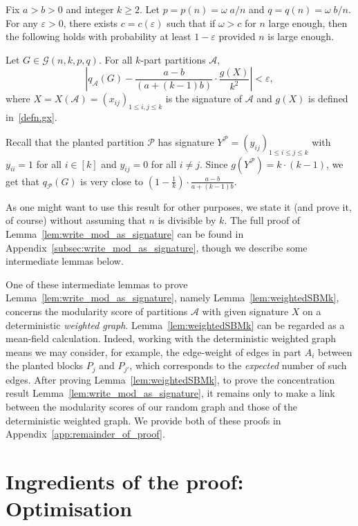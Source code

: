 \documentclass[a4paper,UKenglish,cleveref, autoref, thm-restate,numberwithinsect]{lipics-v2021}
\newcommand{\cA}{\mathcal{A}}
\newcommand{\cP}{\mathcal{P}}
\newcommand{\eps}{\varepsilon}
\begin{document}
\begin{lemma}
\label{lem:write_mod_as_signature}
Fix $a>b>0$ and integer $k\geq 2$. Let $p=p(n)=\omega\; a / n$ and $q=q(n)=\omega \; b/n$. For any $\eps>0$, there exists $c=c(\eps)$ such that if $\omega>c$ for $n$ large enough, then the following holds with probability at least $1-\eps$ provided $n$ is large enough.


Let $G \in \mathcal{G}(n,k,p,q)$. For all $k$-part partitions $\cA$, 
\[ 
\left| q_\cA(G) - \frac{a-b}{(a+(k-1)b)} \cdot \frac {g(X)}{k^2} \right| < \eps, 
\]
where $X = X(\cA) =(x_{ij})_{1\leq i,j \leq k}$ is the signature of $\cA$ and $g(X)$ is defined  in~\eqref{defn.gx}.
\end{lemma}

Recall that the planted partition $\cP$ has signature $Y^{\cP}=(y_{ij})_{1\leq i \leq j \leq k}$ with $y_{ii}=1$ for all $i \in [k]$ and $y_{ij}=0$ for all $i\neq j$. Since $g(Y^{\cP}) = k \cdot (k-1)$, we get that $q_\cP (G)$ is very close to $\left(1-\frac {1}{k}\right) \cdot \frac{a-b}{a+(k-1)b}$. 


As one might want to use this result for other purposes, we state it (and prove it, of course) without assuming that $n$ is divisible by $k$. The full proof of Lemma~\ref{lem:write_mod_as_signature} can be found in {Appendix~\ref{subsec:write_mod_as_signature},} though we describe some intermediate lemmas below.

One of these intermediate lemmas to prove Lemma~\ref{lem:write_mod_as_signature}, namely Lemma~\ref{lem:weightedSBMk},  concerns the modularity score of partitions $\cA$ with given signature $X$ on a deterministic \emph{weighted graph}. Lemma~\ref{lem:weightedSBMk} can be regarded as a mean-field calculation. Indeed, working with the deterministic weighted graph means we may consider, for example, the edge-weight of edges in part $A_i$ between the planted blocks $P_j$ and $P_{j'}$, which corresponds to the \emph{expected} number of such edges. 
%
%
%
After proving Lemma~\ref{lem:weightedSBMk}, to prove the concentration result Lemma~\ref{lem:write_mod_as_signature}, it remains only to make a link between the modularity scores of our random graph and those of the deterministic weighted graph. We provide both of these proofs in Appendix~\ref{app:remainder_of_proof}. 



\section{Ingredients of the proof: Optimisation}
\label{sec:optimisation}
\end{document}
